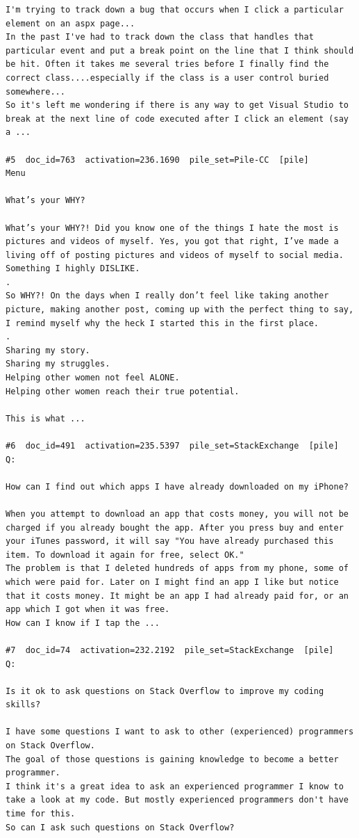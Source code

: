 \begin{verbatim}
I'm trying to track down a bug that occurs when I click a particular element on an aspx page...
In the past I've had to track down the class that handles that particular event and put a break point on the line that I think should be hit. Often it takes me several tries before I finally find the correct class....especially if the class is a user control buried somewhere...
So it's left me wondering if there is any way to get Visual Studio to break at the next line of code executed after I click an element (say a ...

#5  doc_id=763  activation=236.1690  pile_set=Pile-CC  [pile]
Menu

What’s your WHY?

What’s your WHY?! Did you know one of the things I hate the most is pictures and videos of myself. Yes, you got that right, I’ve made a living off of posting pictures and videos of myself to social media. Something I highly DISLIKE.
.
So WHY?! On the days when I really don’t feel like taking another picture, making another post, coming up with the perfect thing to say, I remind myself why the heck I started this in the first place.
.
Sharing my story.
Sharing my struggles.
Helping other women not feel ALONE.
Helping other women reach their true potential.

This is what ...

#6  doc_id=491  activation=235.5397  pile_set=StackExchange  [pile]
Q:

How can I find out which apps I have already downloaded on my iPhone?

When you attempt to download an app that costs money, you will not be charged if you already bought the app. After you press buy and enter your iTunes password, it will say "You have already purchased this item. To download it again for free, select OK."
The problem is that I deleted hundreds of apps from my phone, some of which were paid for. Later on I might find an app I like but notice that it costs money. It might be an app I had already paid for, or an app which I got when it was free.
How can I know if I tap the ...

#7  doc_id=74  activation=232.2192  pile_set=StackExchange  [pile]
Q:

Is it ok to ask questions on Stack Overflow to improve my coding skills?

I have some questions I want to ask to other (experienced) programmers on Stack Overflow.
The goal of those questions is gaining knowledge to become a better programmer.
I think it's a great idea to ask an experienced programmer I know to take a look at my code. But mostly experienced programmers don't have time for this. 
So can I ask such questions on Stack Overflow?


\end{verbatim}
